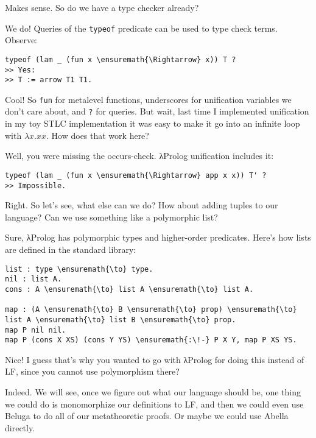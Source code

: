 \heroSTUDENT{} Makes sense. So do we have a type checker already?

\heroADVISOR{} We do! Queries of the \texttt{typeof} predicate can be used to
type check terms. Observe:

\importantCodeblock{}

\begin{verbatim}
typeof (lam _ (fun x \ensuremath{\Rightarrow} x)) T ?
>> Yes:
>> T := arrow T1 T1.
\end{verbatim}

\importantCodeblockEnd{}

\heroSTUDENT{} Cool! So \texttt{fun} for metalevel functions, underscores for
unification variables we don't care about, and \texttt{?} for queries.
But wait, last time I implemented unification in my toy STLC
implementation it was easy to make it go into an infinite loop with
\(\lambda x. x x\). How does that work here?

\heroADVISOR{} Well, you were missing the occurs-check. \foreignlanguage{greek}{λ}Prolog unification
includes it:

\begin{verbatim}
typeof (lam _ (fun x \ensuremath{\Rightarrow} app x x)) T' ?
>> Impossible.
\end{verbatim}

\heroSTUDENT{} Right. So let's see, what else can we do? How about adding
tuples to our language? Can we use something like a polymorphic list?

\heroADVISOR{} Sure, \foreignlanguage{greek}{λ}Prolog has polymorphic types and higher-order
predicates. Here's how lists are defined in the standard library:

\begin{verbatim}
list : type \ensuremath{\to} type.
nil : list A.
cons : A \ensuremath{\to} list A \ensuremath{\to} list A.

map : (A \ensuremath{\to} B \ensuremath{\to} prop) \ensuremath{\to} list A \ensuremath{\to} list B \ensuremath{\to} prop.
map P nil nil.
map P (cons X XS) (cons Y YS) \ensuremath{:\!-} P X Y, map P XS YS.
\end{verbatim}

\heroSTUDENT{} Nice! I guess that's why you wanted to go with \foreignlanguage{greek}{λ}Prolog for
doing this instead of LF, since you cannot use polymorphism there?

\heroADVISOR{} Indeed. We will see, once we figure out what our language
should be, one thing we could do is monomorphize our definitions to LF,
and then we could even use Beluga \citep{beluga-main-reference} to do
all of our metatheoretic proofs. Or maybe we could use Abella
\citep{abella-main-reference} directly.

